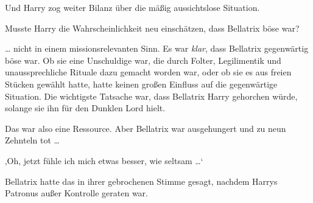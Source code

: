 Und Harry zog weiter Bilanz über die mäßig aussichtslose Situation.

Musste Harry die Wahrscheinlichkeit neu einschätzen, dass Bellatrix böse war?

… nicht in einem missionsrelevanten Sinn. Es war \emph{klar}, dass Bellatrix gegenwärtig böse war. Ob sie eine Unschuldige war, die durch Folter, Legilimentik und unaussprechliche Rituale dazu gemacht worden war, oder ob sie es aus freien Stücken gewählt hatte, hatte keinen großen Einfluss auf die gegenwärtige Situation. Die wichtigste Tatsache war, dass Bellatrix Harry gehorchen würde, solange sie ihn für den Dunklen Lord hielt.

Das war also eine Ressource. Aber Bellatrix war ausgehungert und zu neun Zehnteln tot …

‚Oh, jetzt fühle ich mich etwas besser, wie seltsam …‘

Bellatrix hatte das in ihrer gebrochenen Stimme gesagt, nachdem Harrys Patronus außer Kontrolle geraten war.

